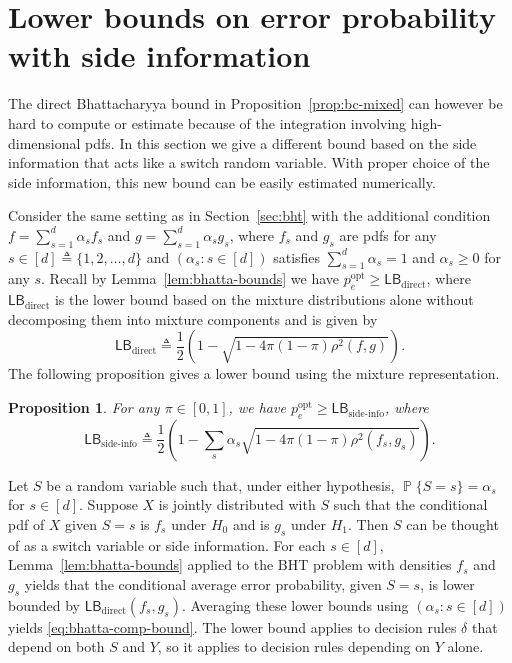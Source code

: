 \documentclass[conference,letterpaper]{IEEEtran}
\newcommand{\defeq}{\triangleq}
\renewcommand{\Pr}{\operatorname{\mathbb P}}%
\newcommand{\ind}[2]{\left(#1\colon #2\right)} %
\newtheorem{prop}{Proposition}
\newcommand{\mixWeight}{\alpha}%
\newcommand{\LBDirect}{\mathsf{LB}_{\text{direct}}}%
\newcommand{\LBSide}{\mathsf{LB}_{\text{side-info}}}%
\newcommand{\errorOpt}{p_e^{\mathrm{opt}}}
\begin{document}
\section{Lower bounds on error probability with side information}
\label{sec:side-info}
The direct Bhattacharyya bound in Proposition~\ref{prop:bc-mixed} can
however be hard to compute or estimate because of the integration
involving high-dimensional pdfs.  In this section we give a different
bound based on the side information that acts like a switch random
variable.  With proper choice of the side information, this new bound
can be easily estimated numerically.

Consider the same setting as in Section~\ref{sec:bht} with the
additional condition $f = \sum_{s = 1}^d\mixWeight_sf_s$ and
$g = \sum_{s = 1}^d\mixWeight_sg_s$, where $f_s$ and $g_s$ are pdfs
for any $s\in[d]\defeq\{1, 2, \dots, d\}$ and
$\ind{\mixWeight_s}{s\in[d]}$ satisfies
$\sum_{s = 1}^d\mixWeight_s = 1$ and $\mixWeight_s \ge 0$ for any $s$.
Recall by Lemma~\ref{lem:bhatta-bounds} we have
$\errorOpt \ge \LBDirect$, where $\LBDirect$ is the lower bound based
on the mixture distributions alone without decomposing them into
mixture components and is given by
\begin{equation}
  \label{eq:bhatta-mix-bound}
  \LBDirect \defeq\frac 12\left(1 - \sqrt{1-4\pi(1 - \pi)\rho^2(f, g)}\right).
\end{equation}
The following proposition gives a lower bound using the mixture
representation.\\[-1em]
\begin{prop}
  \label{prop:bc-coupling}
  For any $\pi\in[0, 1]$, we have $\errorOpt \ge \LBSide$, where
  \begin{equation}
    \label{eq:bhatta-comp-bound}
    \LBSide \defeq\frac 12\left(1 - \sum_s\mixWeight_s\sqrt{1 - 4\pi(1
        - \pi)\rho^2(f_s, g_s)}\right).
  \end{equation}
\end{prop}
\begin{IEEEproof}
  Let $S$ be a random variable such that, under either hypothesis,
  $\Pr\{S = s\} = \alpha_s$ for $s\in [d]$.  Suppose $X$ is jointly
  distributed with $S$ such that the conditional pdf of $X$ given
  $S = s$ is $f_s$ under $H_0$ and is $g_s$ under $H_1$.  Then $S$ can
  be thought of as a switch variable or side information.  For each
  $s\in [d]$, Lemma~\ref{lem:bhatta-bounds} applied to the BHT problem
  with densities $f_s$ and $g_s$ yields that the conditional average
  error probability, given $S = s$, is lower bounded by
  $\LBDirect(f_s, g_s)$.  Averaging these lower bounds using
  $\ind{\alpha_s}{s\in [d]}$ yields \eqref{eq:bhatta-comp-bound}.  The
  lower bound applies to decision rules $\delta$ that depend on both
  $S$ and $Y$, so it applies to decision rules depending on $Y$ alone.
\end{IEEEproof}
\end{document}
